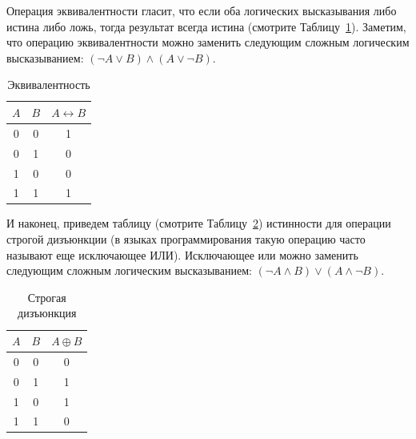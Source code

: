 Операция эквивалентности гласит, что если оба логических высказывания либо истина либо ложь, тогда
результат всегда истина (смотрите Таблицу~\ref{tab:equivalence}). Заметим, что операцию эквивалентности
можно заменить следующим сложным логическим высказыванием: $(\lnot A \vee B) \wedge (A \vee \lnot B)$.

\begin{table}[!ht]
\centering
\begin{tabular}{|c|c|c|}
\hline
$A$ & $B$ & $A \leftrightarrow B$ \\\hline
0   &  0  &  1 \\\hline
0   &  1  &  0 \\\hline
1   &  0  &  0 \\\hline
1   &  1  &  1 \\\hline
\end{tabular}
\caption{Эквивалентность}
\label{tab:equivalence}
\end{table}

И наконец, приведем таблицу (смотрите Таблицу~\ref{tab:xor}) 
истинности для операции строгой дизъюнкции (в языках 
программирования такую операцию часто называют еще исключающее ИЛИ). 
Исключающее или можно заменить следующим сложным логическим
высказыванием: $(\lnot A \wedge B) \vee (A \wedge \lnot B)$. 

\begin{table}[!h]
\centering
\begin{tabular}{|c|c|c|}
\hline
$A$ & $B$ & $A \oplus B$ \\\hline
0   &  0  &  0 \\\hline
0   &  1  &  1 \\\hline
1   &  0  &  1 \\\hline
1   &  1  &  0 \\\hline
\end{tabular}
\caption{Строгая дизъюнкция}
\label{tab:xor}
\end{table}

